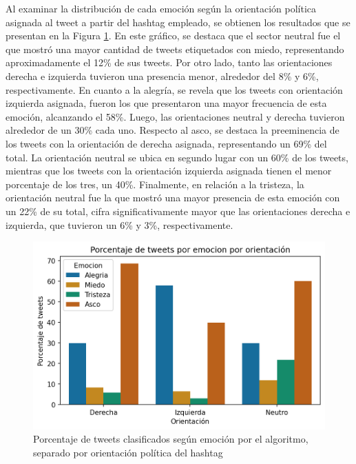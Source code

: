 Al examinar la distribución de cada emoción según la orientación política asignada al tweet a partir del hashtag empleado, se obtienen los resultados que se presentan en la Figura \ref{figure:porcentaje_emocion}. En este gráfico, se destaca que el sector neutral fue el que mostró una mayor cantidad de tweets etiquetados con miedo, representando aproximadamente el 12\% de sus tweets. Por otro lado, tanto las orientaciones derecha e izquierda tuvieron una presencia menor, alrededor del 8\% y 6\%, respectivamente. En cuanto a la alegría, se revela que los tweets con orientación izquierda asignada, fueron los que presentaron una mayor frecuencia de esta emoción, alcanzando el 58\%. Luego, las orientaciones neutral y derecha tuvieron alrededor de un 30\% cada uno. Respecto al asco, se destaca la preeminencia de los tweets con la orientación de derecha asignada, representando un 69\% del total. La orientación neutral se ubica en segundo lugar con un 60\% de los tweets, mientras que los tweets con la orientación izquierda asignada tienen el menor porcentaje de los tres, un 40\%. Finalmente, en relación a la tristeza, la orientación  neutral fue la que mostró una mayor presencia de esta emoción con un 22\% de su total, cifra significativamente mayor que las orientaciones derecha e izquierda, que tuvieron un 6\% y 3\%, respectivamente.



\begin{figure}[!htbp]
	\centering
	\includegraphics{Images & Logos/Results/Porcentaje de tweets por emocion por sector.png}
	\caption{Porcentaje de tweets clasificados según emoción por el algoritmo, separado por orientación política del hashtag}
	\label{figure:porcentaje_emocion}
\end{figure}





